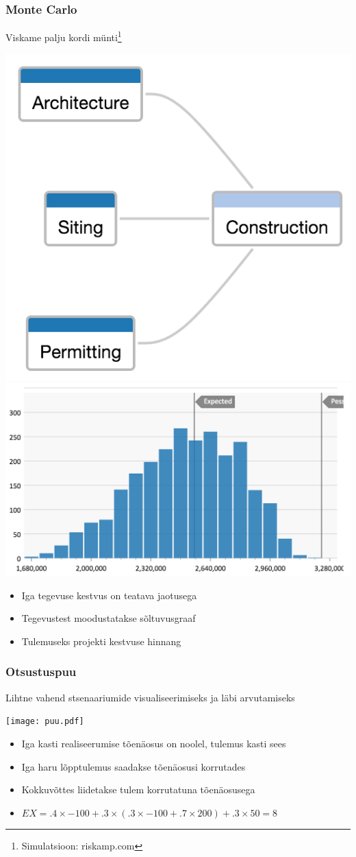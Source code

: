 \begin{frame}[fragile]
  \frametitle{Monte Carlo}
  Viskame palju kordi münti\footnote{Simulatsioon: riskamp.com}
  	\begin{center}
			\includegraphics[width=.3\textwidth]{graaf.png}			\includegraphics[width=.5\textwidth]{jaotus.png}
	\end{center}
	\begin{itemize}
		\item Iga tegevuse kestvus on teatava jaotusega
		\item Tegevustest moodustatakse sõltuvusgraaf
		\item Tulemuseks projekti kestvuse hinnang
	\end{itemize}

\end{frame}


\begin{frame}[fragile]
  \frametitle{Otsustuspuu}
  Lihtne vahend stsenaariumide visualiseerimiseks ja läbi arvutamiseks
  	\begin{center}
			\texttt{[image: puu.pdf]}
	\end{center}
	\begin{itemize}
		\item Iga kasti realiseerumise tõenäosus on noolel, tulemus kasti sees
		\item Iga haru lõpptulemus saadakse tõenäosusi korrutades
		\item Kokkuvõttes liidetakse tulem korrutatuna tõenäosusega
		\item $EX=.4\times-100+.3\times(.3\times-100+.7\times200)+.3\times50=8$
	\end{itemize}

\end{frame}


